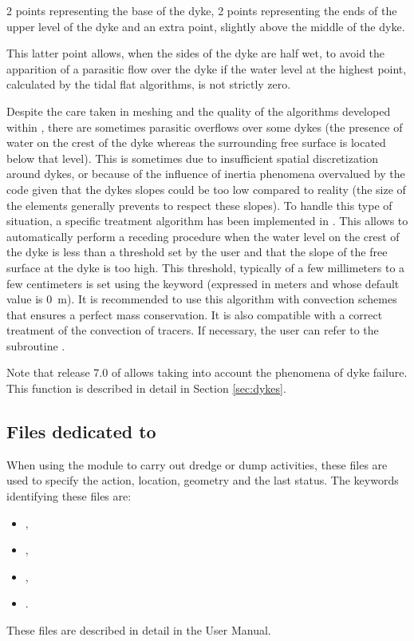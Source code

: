 2 points representing the base of the dyke, 2 points representing the ends of
the upper level of the dyke and an extra point, slightly above the middle of the dyke.


This latter point allows, when the sides of the dyke are half wet,
to avoid the apparition of a parasitic flow over the dyke if the water level at
the highest point, calculated by the tidal flat algorithms, is not strictly zero.

Despite the care taken in meshing and the quality of the algorithms developed
within , there are sometimes parasitic overflows over some dykes
(the presence of water on the crest of the dyke whereas the surrounding free
surface is located below that level).
This is sometimes due to insufficient spatial discretization around dykes,
or because of the influence of inertia phenomena overvalued by the code
given that the dykes slopes could be too low compared to reality
(the size of the elements generally prevents to respect these slopes).
To handle this type of situation, a specific treatment algorithm has been
implemented in .
This allows to automatically perform a receding procedure when the water level
on the crest of the dyke is less than a threshold set by the user
and that the slope of the free surface at the dyke is too high.
This threshold, typically of a few millimeters to a few centimeters
is set using the keyword 
(expressed in meters and whose default value is 0~m).
It is recommended to use this algorithm with convection schemes
that ensures a perfect mass conservation.
It is also compatible with a correct treatment of the convection of tracers.
If necessary, the user can refer to the subroutine .

Note that release 7.0 of  allows taking into account the phenomena
of dyke failure.
This function is described in detail in Section \ref{sec:dykes}.

\subsection{Files dedicated to \nestor}

When using the module \nestor to carry out dredge or dump activities, these
files are used to specify the action, location, geometry and the last status.
The keywords identifying these files are:

\begin{itemize}
\item {},

\item {},

\item {},

\item {}.
\end{itemize}

These files are described in detail in the \nestor User Manual. 
